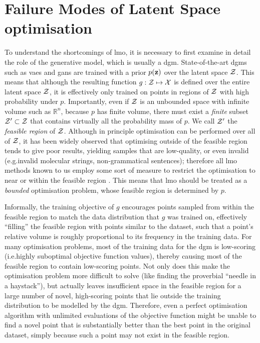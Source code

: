 \section{Failure Modes of Latent Space optimisation}
\label{sec:lso:limitations}
To understand the shortcomings of \gls{lmo},
it is necessary to first examine in detail the role of the generative model, which is usually a \gls{dgm}.
State-of-the-art \glspl{dgm} such as \glspl{vae} and \glspl{gan}
are trained with a prior $p(\mathbf{z})$ over the latent space $\mathcal{Z}$.
This means that although the resulting function $g:\mathcal{Z}\mapsto\mathcal{X}$ is defined over the entire latent space $\mathcal{Z}$,
it is effectively only trained on points in regions of $\mathcal{Z}$ with high probability under $p$.
Importantly, even if $\mathcal{Z}$ is an unbounded space with infinite volume such as $\mathbb{R}^n$,
because $p$ has finite volume, there must exist a \emph{finite} subset $\mathcal{Z}'\subset\mathcal{Z}$ that contains virtually all the probability mass of $p$.
We call $\mathcal{Z}'$ the \emph{feasible region} of $\mathcal{Z}$.
Although in principle optimisation can be performed over all of $\mathcal{Z}$,
it has been widely observed that optimising outside of the feasible region tends to give poor results,
yielding samples that are low-quality, or even invalid (e.g.\@ invalid molecular strings, non-grammatical sentences);
therefore all \gls{lmo} methods known to us employ some sort of measure to restrict the optimisation to near or within the feasible region
\citep{gomez2018,kusner_grammar_2017,nguyen_synthesizing_2016,griffiths_constrained_2020,white_sampling_2016,mahmood_cold_2019,daxberger2019bayesian}.
This means that \gls{lmo} should be treated as a \emph{bounded} optimisation problem,
whose feasible region is determined by $p$.

Informally, the training objective of $g$ encourages points sampled from within the feasible region to match the data distribution that $g$
was trained on, effectively ``filling'' the feasible region with points similar to the dataset,
such that a point's relative volume is roughly proportional to its frequency in the training data.
For many optimisation problems, most of the training data for the \gls{dgm} is low-scoring
(i.e.\@ highly suboptimal objective function values),
thereby causing most of the feasible region to contain low-scoring points.
Not only does this make the optimisation problem more difficult to solve (like finding the proverbial ``needle in a haystack''),
but actually leaves insufficient space in the feasible region for a large number of novel, high-scoring points that lie outside the training distribution to be modelled by the \gls{dgm}.
Therefore, even a perfect optimisation algorithm with unlimited evaluations of the objective function
might be unable to find a novel point
that is substantially better than the best point in the original dataset,
simply because such a point may not exist in the feasible region.


